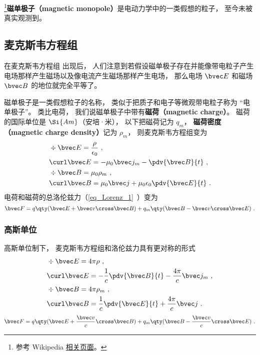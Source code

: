 

\begin{issues}
\issueDraft
\end{issues}

\footnote{参考 Wikipedia \href{https://en.wikipedia.org/wiki/Magnetic_monopole}{相关页面}。}\textbf{磁单极子（magnetic monopole）}是电动力学中的一类假想的粒子， 至今未被真实观测到。

\subsection{麦克斯韦方程组}

 在麦克斯韦方程组 出现后， 人们注意到若假设磁单极子存在并能像带电粒子产生电场那样产生磁场以及像电流产生磁场那样产生电场， 那么电场 $\bvec E$ 和磁场 $\bvec B$ 的地位就完全平等了。

磁单极子是一类假想粒子的名称， 类似于把质子和电子等微观带电粒子称为 “电单极子”。 类比电荷， 我们说磁单极子中带有\textbf{磁荷（magnetic charge）}。 磁荷的国际单位是 $\Si{Am}$（安培·米）， 以下把磁荷记为 $q_m$， \textbf{磁荷密度（magnetic charge density）}记为 $\rho_m$， 则麦克斯韦方程组变为
\begin{equation}
\begin{aligned}
&\div \bvec E = \frac{\rho}{\epsilon_0}~,\\
&\curl \bvec E = - \mu_0 \bvec j_m -\pdv{\bvec B}{t}~,\\
&\div \bvec B = \mu_0 \rho_m~,\\
&\curl \bvec B = \mu_0 \bvec j + \mu_0\epsilon_0 \pdv{\bvec E}{t}~.
\end{aligned}
\end{equation}
电荷和磁荷的总洛伦兹力（\autoref{eq_Lorenz_1}~）变为
\begin{equation}
\bvec F = q \qty(\bvec E + \bvec v \cross \bvec B) +
q_m \qty(\bvec B - \bvec v \cross \bvec E)~.
\end{equation}


\subsubsection{高斯单位}
高斯单位制下， 麦克斯韦方程组和洛伦兹力具有更对称的形式
\begin{equation}\label{eq_BMono_1}
\begin{aligned}
&\div \bvec E = 4\pi\rho~,\\
&\curl \bvec E = -\frac{1}{c}\pdv{\bvec B}{t}  - \frac{4\pi}{c}\bvec j_m~,\\
&\div \bvec B = 4\pi\rho_m~,\\
&\curl \bvec B = \frac{1}{c}\pdv{\bvec E}{t} + \frac{4\pi}{c} \bvec j~.
\end{aligned}
\end{equation}
\begin{equation}
\bvec F = q \qty(\bvec E + \frac{\bvec v}{c}\cross \bvec B) + q_m \qty(\bvec B - \frac{\bvec v}{c}\cross \bvec E)~.
\end{equation}


